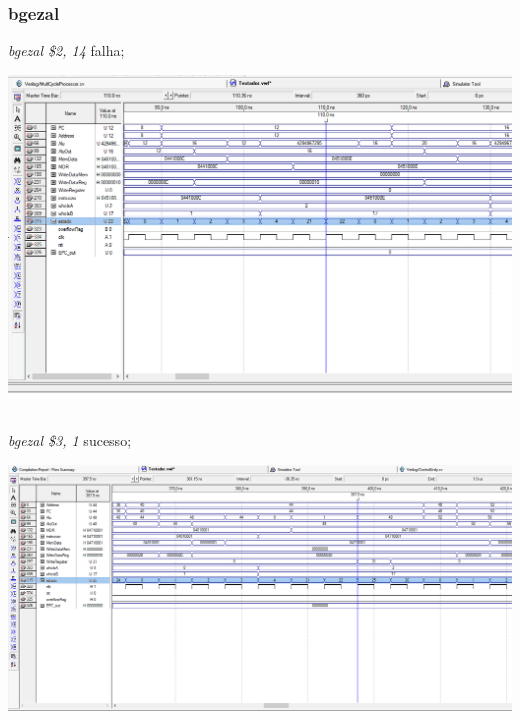 \documentclass{article}
\begin{document}
    \subsubsection{bgezal}
    {\it bgezal \$2, 14} falha;\\
    \begin{center}
        \includegraphics[scale=0.25]{bgezalfalha.PNG}
    \end{center}
    \\
    {\it bgezal \$3, 1} sucesso;\\
    \begin{center}
        \includegraphics[scale=0.25]{bgezalsucesso.PNG}
    \end{center}
    
    \\
    \newpage
\end{document}

